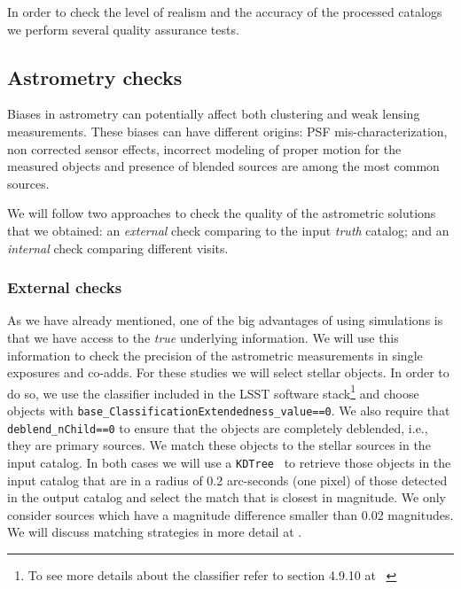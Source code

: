 \documentclass[\docopts]{\docclass}
\begin{document}
In order to check the level of realism and the accuracy of the processed catalogs we perform several quality assurance tests.

\subsection{Astrometry checks}
\label{sec:astrometry_checks}

Biases in astrometry can potentially affect both clustering and weak lensing measurements. These biases can have different origins: PSF mis-characterization, non corrected sensor effects, incorrect modeling of proper motion for the measured objects and presence of blended sources are among the most common sources.

We will follow two approaches to check the quality of the astrometric solutions that we obtained: an \textit{external} check comparing to the input \textit{truth} catalog; and an \textit{internal} check comparing different visits.

\subsubsection{External checks}
\label{sec:external_astrometry}

As we have already mentioned, one of the big advantages of using simulations is that we have access to the \textit{true} underlying information. We will use this information to check the precision of the astrometric measurements in single exposures
and co-adds. For these studies we will select stellar objects. In order to do so, we use the classifier included in the LSST software stack\footnote{To see more details about the classifier refer to section 4.9.10 at ~\citep{2017arXiv170506766B}} and choose objects with \texttt{base\_ClassificationExtendedness\_value==0}.
We also require that \texttt{deblend\_nChild==0} to ensure that the objects are completely deblended, i.e., they are primary sources. We match these objects to the stellar sources in the input catalog. In both cases we will use a \texttt{KDTree}~\citep{scikit-learn} to retrieve those objects in the input catalog that are in a radius of 0.2 arc-seconds (one pixel) of those detected in the output catalog and select the match that is closest in magnitude. We only consider sources which have a magnitude difference smaller than 0.02 magnitudes. We will discuss matching strategies in more detail at .
\end{document}

